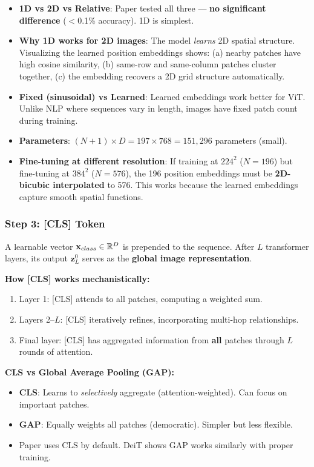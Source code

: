 \begin{keybox}
\begin{itemize}
\item \textbf{1D vs 2D vs Relative}: Paper tested all three — \textbf{no significant difference} ($<$0.1\% accuracy). 1D is simplest.
\item \textbf{Why 1D works for 2D images}: The model \emph{learns} 2D spatial structure. Visualizing the learned position embeddings shows: (a) nearby patches have high cosine similarity, (b) same-row and same-column patches cluster together, (c) the embedding recovers a 2D grid structure automatically.
\item \textbf{Fixed (sinusoidal) vs Learned}: Learned embeddings work better for ViT. Unlike NLP where sequences vary in length, images have fixed patch count during training.
\item \textbf{Parameters}: $(N+1) \times D = 197 \times 768 = 151,296$ parameters (small).
\item \textbf{Fine-tuning at different resolution}: If training at $224^2$ ($N{=}196$) but fine-tuning at $384^2$ ($N{=}576$), the 196 position embeddings must be \textbf{2D-bicubic interpolated} to 576. This works because the learned embeddings capture smooth spatial functions.
\end{itemize}
\end{keybox}

\subsubsection{Step 3: [CLS] Token}
A learnable vector $\mathbf{x}_{class} \in \mathbb{R}^D$ is prepended to the sequence. After $L$ transformer layers, its output $\mathbf{z}_L^0$ serves as the \textbf{global image representation}.

\textbf{How [CLS] works mechanistically:}
\begin{enumerate}
\item Layer 1: [CLS] attends to all patches, computing a weighted sum.
\item Layers 2--$L$: [CLS] iteratively refines, incorporating multi-hop relationships.
\item Final layer: [CLS] has aggregated information from \textbf{all} patches through $L$ rounds of attention.
\end{enumerate}

\textbf{CLS vs Global Average Pooling (GAP):}
\begin{itemize}
\item \textbf{CLS}: Learns to \emph{selectively} aggregate (attention-weighted). Can focus on important patches.
\item \textbf{GAP}: Equally weights all patches (democratic). Simpler but less flexible.
\item Paper uses CLS by default. DeiT shows GAP works similarly with proper training.
\end{itemize}

